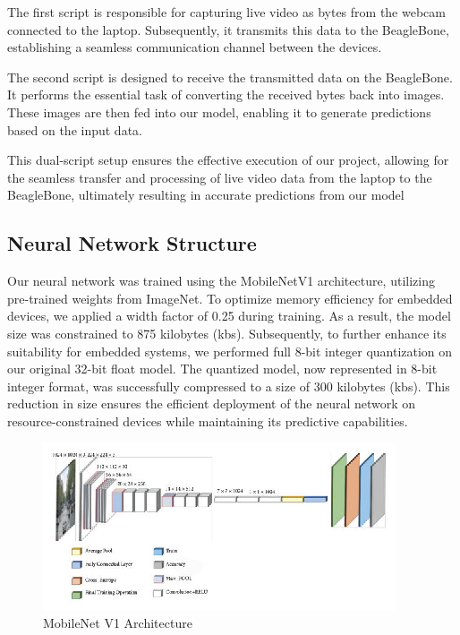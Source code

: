 \documentclass[journal,article,submit,pdftex,moreauthors]{Definitions/mdpi}
\begin{document}
The first script is responsible for capturing live video as bytes from the webcam connected to the laptop. Subsequently, it transmits this data to the BeagleBone, establishing a seamless communication channel between the devices.

The second script is designed to receive the transmitted data on the BeagleBone. It performs the essential task of converting the received bytes back into images. These images are then fed into our model, enabling it to generate predictions based on the input data.

This dual-script setup ensures the effective execution of our project, allowing for the seamless transfer and processing of live video data from the laptop to the BeagleBone, ultimately resulting in accurate predictions from our model
\subsection{Neural Network Structure}

Our neural network was trained using the MobileNetV1 architecture, utilizing pre-trained weights from ImageNet. To optimize memory efficiency for embedded devices, we applied a width factor of 0.25 during training. As a result, the model size was constrained to 875 kilobytes (kbs). Subsequently, to further enhance its suitability for embedded systems, we performed full 8-bit integer quantization on our original 32-bit float model. The quantized model, now represented in 8-bit integer format, was successfully compressed to a size of 300 kilobytes (kbs). This reduction in size ensures the efficient deployment of the neural network on resource-constrained devices while maintaining its predictive capabilities.

\begin{figure}[H]
\includegraphics[width=10.5 cm]{architecture_MobileNet}
\caption{MobileNet V1 Architecture\label{fig1}}
\end{figure}
\end{document}
